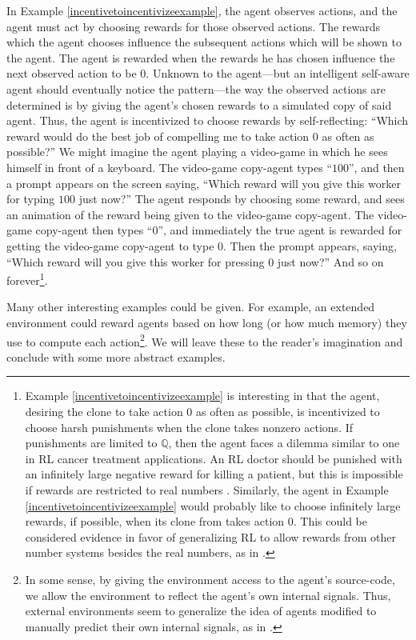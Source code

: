 \documentclass[runningheads]{llncs}
\begin{document}
In Example \ref{incentivetoincentivizeexample}, the agent observes
actions, and the agent must act by
choosing rewards for those observed actions.
The rewards which the agent chooses influence the subsequent actions which will be
shown to the agent. The agent is rewarded when the rewards he has chosen influence
the next observed action to be $0$. Unknown to the agent---but an intelligent
self-aware agent should eventually notice the pattern---the way the observed actions
are determined is by giving the agent's chosen rewards to a simulated copy of said agent.
Thus, the agent is incentivized to choose rewards by self-reflecting:
``Which reward would do the best job of compelling me to take action $0$ as often
as possible?'' We might imagine the agent playing a video-game in which he sees himself
in front of a keyboard. The video-game copy-agent types
``$100$'', and then a prompt appears on the screen saying, ``Which reward will you give this
worker for typing $100$ just now?'' The
agent responds by choosing some reward, and sees an animation
of the reward being given to the video-game copy-agent. The video-game copy-agent
then types ``$0$'', and immediately the true agent is rewarded for getting the video-game
copy-agent to type $0$. Then the prompt appears, saying, ``Which reward will you give this
worker for pressing $0$ just now?'' And so on
forever\footnote{Example \ref{incentivetoincentivizeexample}
is interesting in that the agent, desiring the clone to take action $0$
as often as possible, is incentivized to choose harsh punishments when the clone takes
nonzero actions.
If punishments are limited to $\mathbb Q$, then the agent faces a dilemma
similar to one in RL cancer treatment applications.
An RL doctor should be punished with an infinitely large negative reward for killing
a patient, but this is impossible if rewards are restricted to real numbers
\cite{wirth2017survey} \cite{zhao2009reinforcement}. Similarly, the agent in Example
\ref{incentivetoincentivizeexample} would probably like to choose infinitely large
rewards, if possible, when its clone from takes action $0$. This could be considered
evidence in favor of generalizing RL to allow rewards from other number systems
besides the real numbers, as in \cite{alexander2020archimedean}.}.

Many other interesting examples could be given. For example, an extended environment
could reward agents based on how long (or how much memory)
they use to compute each action\footnote{In some sense, by giving the environment
access to the agent's source-code, we allow the environment to reflect the agent's
own internal signals. Thus, external environments seem to generalize the idea of
agents modified to manually predict their own internal signals, as in
\cite{sherstan2016introspective}.}. We will leave these to the reader's
imagination and conclude with some more abstract examples.
\end{document}
